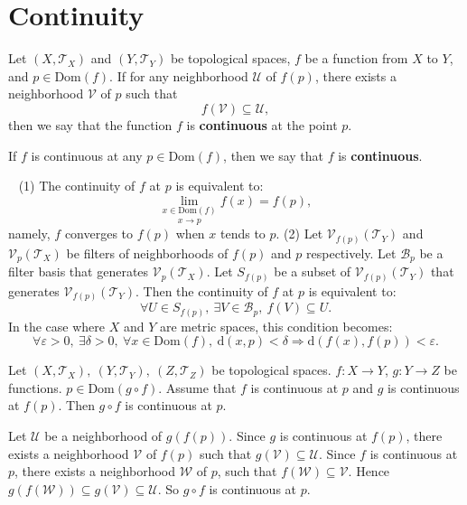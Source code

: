 \section{Continuity}
\begin{definitionenv}
    Let $(X,\mathscr{T}_X)$ and $(Y,\mathscr{T}_Y)$ be topological spaces, $f$ be a function from $X$ to $Y$, and $p\in \mathrm{Dom}(f)$. If for any neighborhood $\mathcal{U}$ of $f(p)$, there exists a neighborhood $\mathcal{V}$ of $p$ such that 
    $$f(\mathcal{V})\subseteq \mathcal{U},$$
    then we say that the function $f$ is \textbf{continuous} at the point $p$. 
    
    If $f$ is continuous at any $p\in \mathrm{Dom}(f)$, then we say that $f$ is \textbf{continuous}.
\end{definitionenv}
\begin{remark}
    \ \newline
    (1) The continuity of $f$ at $p$ is equivalent to:
    $$\underset{x\rightarrow p}{\lim_{x\in \mathrm{Dom}(f)}}f(x)=f(p),$$
    namely, $f$ converges to $f(p)$ when $x$ tends to $p$.
    \newline
    (2) Let $\mathcal{V}_{f(p)}\left(\mathscr{T}_Y\right)$ and $\mathcal{V}_{p}\left(\mathscr{T}_X\right)$ be filters of neighborhoods of $f(p)$ and $p$ respectively. Let $\mathcal{B}_p$ be a filter basis that generates $\mathcal{V}_p\left(\mathscr{T}_X\right)$. Let $S_{f(p)}$ be a subset of $\mathcal{V}_{f(p)}\left(\mathscr{T}_Y\right)$ that generates $\mathcal{V}_{f(p)}\left(\mathscr{T}_Y\right)$. Then the continuity of $f$ at $p$ is equivalent to:
    $$\forall U\in S_{f(p)},\ \exists V\in \mathcal{B}_p,\ f(V)\subseteq U.$$
    In the case where $X$ and $Y$ are metric spaces, this condition becomes:
    $$\forall \varepsilon >0,\ \exists \delta>0,\ \forall x\in \mathrm{Dom}(f),\ \mathrm{d}(x,p)<\delta\Rightarrow \mathrm{d}(f(x),f(p))<\varepsilon.$$
\end{remark}
\begin{propositionenv}
    Let $(X,\mathscr{T}_X),\ (Y,\mathscr{T}_Y),\ (Z,\mathscr{T}_Z)$ be topological spaces. $f: X\longrightarrow Y$, $g: Y\longrightarrow Z$ be functions. $p\in \mathrm{Dom}(g\circ f)$. Assume that $f$ is continuous at $p$ and $g$ is continuous at $f(p)$. Then $g\circ f$ is continuous at $p$.
\end{propositionenv}
\begin{proofenv}
    Let $\mathcal{U}$ be a neighborhood of $g\left(f\left(p\right)\right)$. Since $g$ is continuous at $f(p)$, there exists a neighborhood $\mathcal{V}$ of $f(p)$ such that $g(\mathcal{V})\subseteq\mathcal{U}$. Since $f$ is continuous at $p$, there exists a neighborhood $\mathcal{W}$ of $p$, such that $f(\mathcal{W})\subseteq \mathcal{V}$. Hence $g\left(f\left(\mathcal{W}\right)\right)\subseteq g\left(\mathcal{V}\right)\subseteq\mathcal{U}.$ So $g\circ f$ is continuous at $p$.
\end{proofenv}
